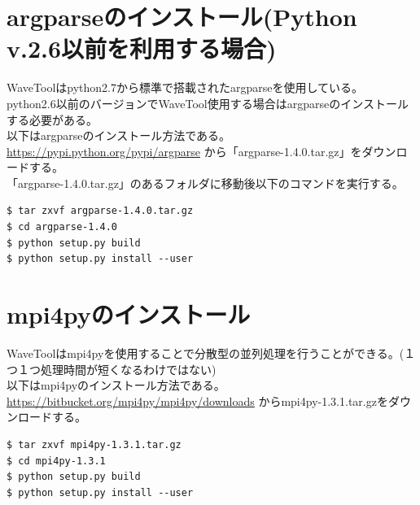 \documentclass{jsarticle}
\begin{document}



\newpage
\appendix

\section{argparseのインストール(Python v.2.6以前を利用する場合)}
	\label{sec:argparseのインストール}
WaveToolはpython2.7から標準で搭載されたargparseを使用している。\\
python2.6以前のバージョンでWaveTool使用する場合はargparseのインストールする必要がある。\\
以下はargparseのインストール方法である。\\

\url{https://pypi.python.org/pypi/argparse}
から「argparse-1.4.0.tar.gz」をダウンロードする。\\
「argparse-1.4.0.tar.gz」のあるフォルダに移動後以下のコマンドを実行する。
\begin{Verbatim}[frame=single]
$ tar zxvf argparse-1.4.0.tar.gz
$ cd argparse-1.4.0
$ python setup.py build
$ python setup.py install --user
\end{Verbatim}

\newpage
\section{mpi4pyのインストール}
	\label{sec:mpi4pyのインストール}
WaveToolはmpi4pyを使用することで分散型の並列処理を行うことができる。(１つ１つ処理時間が短くなるわけではない)\\
以下はmpi4pyのインストール方法である。\\

\url{https://bitbucket.org/mpi4py/mpi4py/downloads}
からmpi4py-1.3.1.tar.gzをダウンロードする。
\begin{Verbatim}[frame=single]
$ tar zxvf mpi4py-1.3.1.tar.gz
$ cd mpi4py-1.3.1
$ python setup.py build
$ python setup.py install --user
\end{Verbatim}
\end{document}

